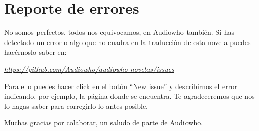 \chapter*{Reporte de errores}

No somos perfectos, todos nos equivocamos, en Audiowho también. Si has detectado
un error o algo que no cuadra en la traducción de esta novela puedes hacérnoslo
saber en:

\mbox{}

\begin{center}
	\href{https://github.com/Audiowho/audiowho-novelas/issues}
  {\textit{https://github.com/Audiowho/audiowho-novelas/issues}}
\end{center}

\mbox{}

Para ello puedes hacer click en el botón “New issue” y describirnos el error
indicando, por ejemplo, la página donde se encuentra. Te agradeceremos que nos
lo hagas saber para corregirlo lo antes posible.

\mbox{}

Muchas gracias por colaborar, un saludo de parte de Audiowho.
